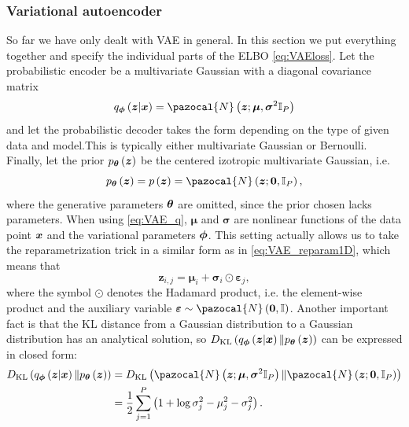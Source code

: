 \subsubsection{Variational autoencoder}
So far we have only dealt with VAE in general. In this section we put everything together and specify the individual parts of the ELBO \eqref{eq:VAEloss}.
Let the probabilistic encoder be a multivariate Gaussian with a diagonal covariance matrix
\begin{equation}\label{eq:VAE_q}
q_{\bphi}\left(\boldsymbol{z}\vert \bx \right) = \pazocal{N}\left(\boldsymbol{z}; \boldsymbol{\mu},\boldsymbol{\sigma}^2\mathbb{I}_P  \right) 
\end{equation}
and let the probabilistic decoder takes the form depending on the type of given data and model.This is typically either multivariate Gaussian or Bernoulli. Finally, let the prior $p_{\boldsymbol{\theta}}\left(\boldsymbol{z}\right)$ be the centered izotropic multivariate Gaussian, i.e.
\begin{equation}
p_{\bt}\left(\boldsymbol{z} \right) = p\left(\boldsymbol{z} \right) = \pazocal{N}\left(\boldsymbol{z}; \boldsymbol{0},\mathbb{I}_P  \right),
\end{equation}
where the generative parameters $\boldsymbol{\theta}$ are omitted, since the prior chosen lacks parameters. When using \eqref{eq:VAE_q}, $\boldsymbol{\mu}$ and $\boldsymbol{\sigma}$ are nonlinear functions of the data point $\boldsymbol{x}$ and the variational parameters $\boldsymbol{\phi}$. This setting actually allows us to take the reparametrization trick in a similar form as in \eqref{eq:VAE_reparam1D}, which means that
\begin{equation}\label{eq:reparam_specific}
\boldsymbol{z}_{i,j} = \boldsymbol{\mu}_i + \boldsymbol{\sigma}_i\odot\boldsymbol{\varepsilon}_j ,
\end{equation}
where the symbol $\odot$ denotes the Hadamard product, i.e. the element-wise product and the auxiliary variable $\boldsymbol{\varepsilon} \sim \pazocal{N}\left(\boldsymbol{0},\mathbb{I} \right)$.
Another important fact is that the KL distance from a Gaussian distribution to a Gaussian distribution has an analytical solution, so $D_{\mathrm{KL}} \left(q_{\boldsymbol{\phi}}\left(\boldsymbol{z}\vert \boldsymbol{x} \right) \Vert p_{\boldsymbol{\theta}}\left(\boldsymbol{z}\right) \right)$ can be expressed in closed form:
\begin{equation}
\begin{split}
 \KL{q_{\bphi}\left(\bz\vert \bx \right)}{p_{\bt}\left(\bz\right)} & = \KL{\pazocal{N}\left(\boldsymbol{z}; \boldsymbol{\mu},\boldsymbol{\sigma}^2\mathbb{I}_P  \right) }{\pazocal{N}\left(\boldsymbol{z}; \boldsymbol{0},\mathbb{I}_P  \right)}\\ & =\frac{1}{2}\sum_{j=1}^P\left(1 + \log\sigma^2_j -\mu_j^2 -\sigma_j^2 \right).
\end{split}
\end{equation}
